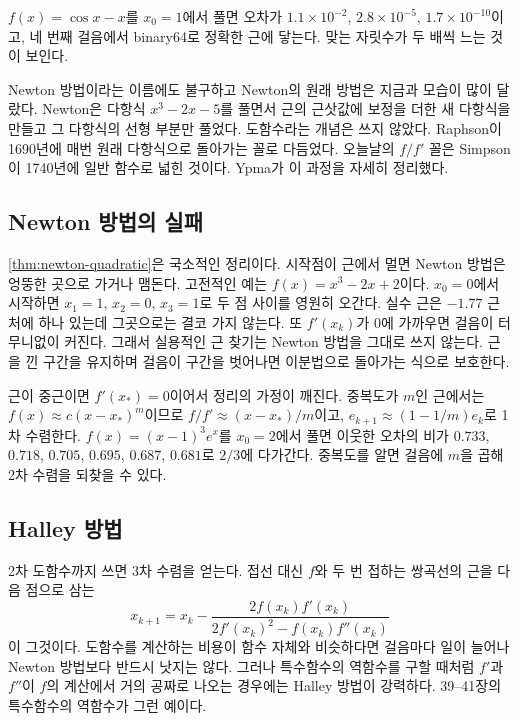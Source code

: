 $f(x)=\cos x-x$를 $x_0=1$에서 풀면 오차가 $1.1\times10^{-2}$, $2.8\times10^{-5}$, $1.7\times10^{-10}$이고, 네 번째 걸음에서 binary64로 정확한 근에 닿는다. 맞는 자릿수가 두 배씩 느는 것이 보인다.

\begin{aside}
Newton 방법이라는 이름에도 불구하고 Newton의 원래 방법은 지금과 모습이 많이 달랐다. Newton은 다항식 $x^3-2x-5$를 풀면서 근의 근삿값에 보정을 더한 새 다항식을 만들고 그 다항식의 선형 부분만 풀었다. 도함수라는 개념은 쓰지 않았다. Raphson이 1690년에 매번 원래 다항식으로 돌아가는 꼴로 다듬었다. 오늘날의 $f/f'$ 꼴은 Simpson이 1740년에 일반 함수로 넓힌 것이다. Ypma가 이 과정을 자세히 정리했다\cite{ypma1995}.
\end{aside}

\subsection{Newton 방법의 실패}

\cref{thm:newton-quadratic}은 국소적인 정리이다. 시작점이 근에서 멀면 Newton 방법은 엉뚱한 곳으로 가거나 맴돈다. 고전적인 예는 $f(x)=x^3-2x+2$이다. $x_0=0$에서 시작하면 $x_1=1$, $x_2=0$, $x_3=1$로 두 점 사이를 영원히 오간다. 실수 근은 $-1.77$ 근처에 하나 있는데 그곳으로는 결코 가지 않는다. 또 $f'(x_k)$가 $0$에 가까우면 걸음이 터무니없이 커진다. 그래서 실용적인 근 찾기는 Newton 방법을 그대로 쓰지 않는다. 근을 낀 구간을 유지하며 걸음이 구간을 벗어나면 이분법으로 돌아가는 식으로 보호한다.

근이 중근이면 $f'(x_\ast)=0$이어서 정리의 가정이 깨진다. 중복도가 $m$인 근에서는 $f(x)\approx c(x-x_\ast)^m$이므로 $f/f'\approx(x-x_\ast)/m$이고, $e_{k+1}\approx(1-1/m)e_k$로 1차 수렴한다. $f(x)=(x-1)^3e^x$를 $x_0=2$에서 풀면 이웃한 오차의 비가 $0.733$, $0.718$, $0.705$, $0.695$, $0.687$, $0.681$로 $2/3$에 다가간다. 중복도를 알면 걸음에 $m$을 곱해 2차 수렴을 되찾을 수 있다.

\subsection{Halley 방법}

2차 도함수까지 쓰면 3차 수렴을 얻는다. 접선 대신 $f$와 두 번 접하는 쌍곡선의 근을 다음 점으로 삼는 
\[
x_{k+1}=x_k-\frac{2f(x_k)f'(x_k)}{2f'(x_k)^2-f(x_k)f''(x_k)}
\]
이 그것이다\cite{scavo1995halley}. 도함수를 계산하는 비용이 함수 자체와 비슷하다면 걸음마다 일이 늘어나 Newton 방법보다 반드시 낫지는 않다. 그러나 특수함수의 역함수를 구할 때처럼 $f'$과 $f''$이 $f$의 계산에서 거의 공짜로 나오는 경우에는 Halley 방법이 강력하다. 39--41장의 특수함수의 역함수가 그런 예이다.

